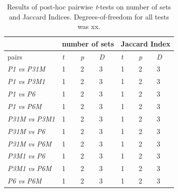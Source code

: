 \documentclass[11pt, twoside]{article}
\begin{document}
\begin{table}[H]
	\centering
	\begin{tabular}{ |p{3cm}||p{1cm}|p{1cm}|p{1cm}||p{1cm}|p{1cm}|p{1cm}| }
	\hline
	\textit{} & \multicolumn{3}{|c||}{number of sets} & \multicolumn{3}{|c|}{Jaccard Index} \\ \hline 
	pairs & \textit{t} & \textit{p} & \textit{D} & \textit{t} & \textit{p} & \textit{D} \\ \hline \hline
	\textit{P1 vs P31M} & 1 & 2 & 3 & 1 & 2 & 3 \\ \hline 
	\textit{P1 vs P3M1} & 1 & 2 & 3 & 1 & 2 & 3 \\ \hline
	\textit{P1 vs P6} & 1 & 2 & 3 & 1 & 2 & 3 \\ \hline
	\textit{P1 vs P6M} & 1 & 2 & 3 & 1 & 2 & 3 \\ \hline
	\textit{P31M vs P3M1} & 1 & 2 & 3 & 1 & 2 & 3 \\ \hline
	\textit{P31M vs P6} & 1 & 2 & 3 & 1 & 2 & 3 \\ \hline
	\textit{P31M vs P6M} & 1 & 2 & 3 & 1 & 2 & 3 \\ \hline
	\textit{P3M1 vs P6} & 1 & 2 & 3 & 1 & 2 & 3 \\ \hline
	\textit{P3M1 vs P6M} & 1 & 2 & 3 & 1 & 2 & 3 \\ \hline
	\textit{P6 vs P6M} & 1 & 2 & 3 & 1 & 2 & 3 \\ \hline
	\end{tabular}
	\caption{Results of post-hoc pairwise \textit{t}-tests on number of sets and Jaccard Indices. Degrees-of-freedom for all tests was xx.}
	\label{table:t-stats}
\end{table}
\end{document}
